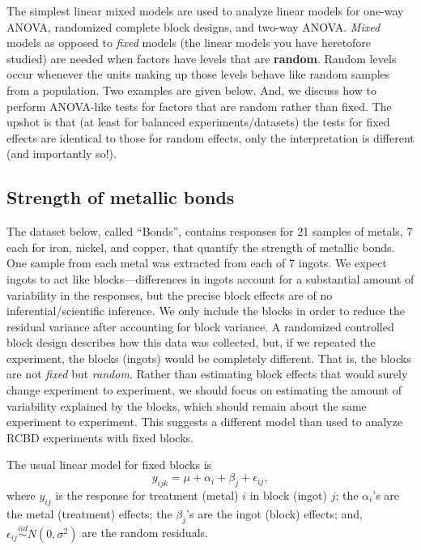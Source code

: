 \documentclass[
]{book}
\begin{document}
The simplest linear mixed models are used to analyze linear models for one-way ANOVA, randomized complete block designs, and two-way ANOVA. \emph{Mixed} models as opposed to \emph{fixed} models (the linear models you have heretofore studied) are needed when factors have levels that are \textbf{random}. Random levels occur whenever the units making up those levels behave like random samples from a population. Two examples are given below. And, we discuss how to perform ANOVA-like tests for factors that are random rather than fixed. The upshot is that (at least for balanced experiments/datasets) the tests for fixed effects are identical to those for random effects, only the interpretation is different (and importantly so!).

\hypertarget{strength-of-metallic-bonds}{%
\subsection{Strength of metallic bonds}\label{strength-of-metallic-bonds}}

The dataset below, called ``Bonds'', contains responses for 21 samples of metals, 7 each for iron, nickel, and copper, that quantify the strength of metallic bonds. One sample from each metal was extracted from each of 7 ingots. We expect ingots to act like blocks---differences in ingots account for a substantial amount of variability in the responses, but the precise block effects are of no inferential/scientific inference. We only include the blocks in order to reduce the residual variance after accounting for block variance. A randomized controlled block design describes how this data was collected, but, if we repeated the experiment, the blocks (ingots) would be completely different. That is, the blocks are not \emph{fixed} but \emph{random}. Rather than estimating block effects that would surely change experiment to experiment, we should focus on estimating the amount of variability explained by the blocks, which should remain about the same experiment to experiment. This suggests a different model than used to analyze RCBD experiments with fixed blocks.

The usual linear model for fixed blocks is
\[y_{ijk} = \mu + \alpha_i + \beta_j + \epsilon_{ij},\]
where \(y_{ij}\) is the response for treatment (metal) \(i\) in block (ingot) \(j\); the \(\alpha_i\)'s are the metal (treatment) effects; the \(\beta_j\)'s are the ingot (block) effects; and, \(\epsilon_{ij}\stackrel{iid}{\sim}N(0,\sigma^2)\) are the random residuals.
\end{document}
